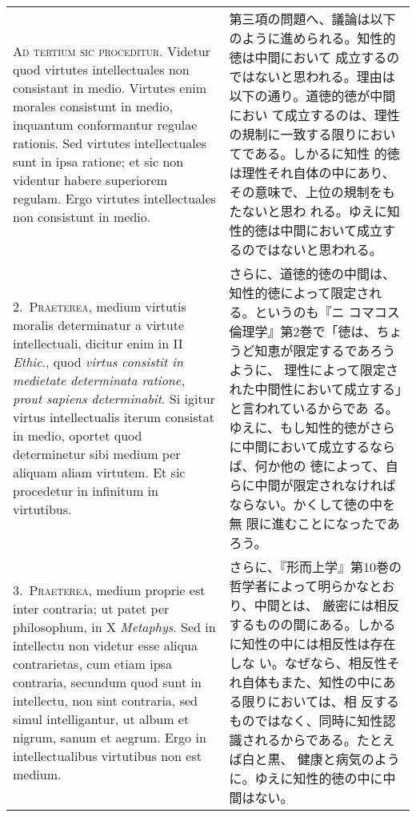 \documentclass[10pt]{jsarticle}
\begin{document}
\begin{longtable}{p{21em}p{21em}}
{\scshape Ad tertium sic proceditur}. Videtur quod virtutes
intellectuales non consistant in medio. Virtutes enim morales
consistunt in medio, inquantum conformantur regulae rationis. Sed
virtutes intellectuales sunt in ipsa ratione; et sic non videntur
habere superiorem regulam. Ergo virtutes intellectuales non consistunt
in medio.


&

 第三項の問題へ、議論は以下のように進められる。知性的徳は中間において
 成立するのではないと思われる。理由は以下の通り。道徳的徳が中間におい
 て成立するのは、理性の規制に一致する限りにおいてである。しかるに知性
 的徳は理性それ自体の中にあり、その意味で、上位の規制をもたないと思わ
 れる。ゆえに知性的徳は中間において成立するのではないと思われる。

\\


2.~{\scshape Praeterea}, medium virtutis moralis determinatur a
virtute intellectuali, dicitur enim in II {\itshape Ethic}., quod
{\itshape virtus consistit in medietate determinata ratione, prout
sapiens determinabit}. Si igitur virtus intellectualis iterum
consistat in medio, oportet quod determinetur sibi medium per aliquam
aliam virtutem. Et sic procedetur in infinitum in virtutibus.


&

 さらに、道徳的徳の中間は、知性的徳によって限定される。というのも『ニ
 コマコス倫理学』第2巻で「徳は、ちょうど知恵が限定するであろうように、
 理性によって限定された中間性において成立する」と言われているからであ
 る。ゆえに、もし知性的徳がさらに中間において成立するならば、何か他の
 徳によって、自らに中間が限定されなければならない。かくして徳の中を無
 限に進むことになったであろう。

\\


3.~{\scshape Praeterea}, medium proprie est inter contraria; ut patet
per philosophum, in X {\itshape Metaphys}. Sed in intellectu non
videtur esse aliqua contrarietas, cum etiam ipsa contraria, secundum
quod sunt in intellectu, non sint contraria, sed simul intelligantur,
ut album et nigrum, sanum et aegrum. Ergo in intellectualibus
virtutibus non est medium.

&

 さらに、『形而上学』第10巻の哲学者によって明らかなとおり、中間とは、
 厳密には相反するものの間にある。しかるに知性の中には相反性は存在しな
 い。なぜなら、相反性それ自体もまた、知性の中にある限りにおいては、相
 反するものではなく、同時に知性認識されるからである。たとえば白と黒、
 健康と病気のように。ゆえに知性的徳の中に中間はない。


\end{longtable}
\end{document}
